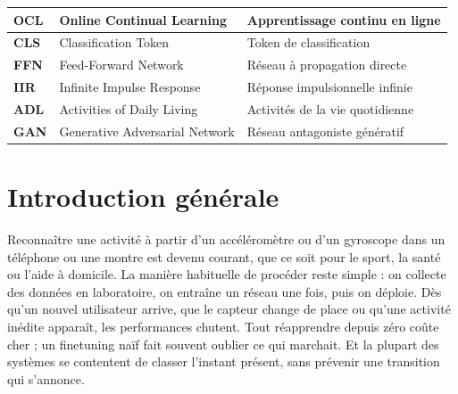 \documentclass[a4paper,12pt]{report}
\begin{document}
\begin{tabularx}{\textwidth}{|p{2.2cm}|>{\raggedright\arraybackslash}X|>{\raggedright\arraybackslash}X|}
    \textbf{OCL} &
Online Continual Learning &
Apprentissage continu en ligne \\
    \hline
    \textbf{CLS} &
Classification Token &
Token de classification \\
    \hline
    \textbf{FFN} &
Feed-Forward Network &
Réseau à propagation directe \\
    \hline
    \textbf{IIR} &
Infinite Impulse Response &
Réponse impulsionnelle infinie \\
    \hline
    \textbf{ADL} &
Activities of Daily Living &
Activités de la vie quotidienne \\
    \hline
    \textbf{GAN} &
Generative Adversarial Network &
Réseau antagoniste génératif \\
    \hline
\end{tabularx}

\endgroup

\clearpage
\pagestyle{fancy}

\clearpage



\cleardoublepage



\clearpage
\chapter*{Introduction générale}
\label{chap:introduction}

Reconnaître une activité à partir d'un accéléromètre ou d'un gyroscope dans un
téléphone ou une montre est devenu courant, que ce soit pour le sport, la santé
ou l'aide à domicile. La manière habituelle de procéder reste simple : on
collecte des données en laboratoire, on entraîne un réseau une fois, puis on
déploie. Dès qu'un nouvel utilisateur arrive, que le capteur change de place
ou qu'une activité inédite apparaît, les performances chutent. Tout réapprendre
depuis zéro coûte cher ; un finetuning naïf fait souvent oublier ce qui
marchait. Et la plupart des systèmes se contentent de classer l'instant
présent, sans prévenir une transition qui s'annonce.
\end{document}
